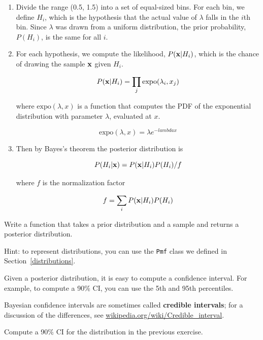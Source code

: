 \documentclass[12pt]{book}
\begin{document}
\begin{enumerate}

\item Divide the range (0.5, 1.5) into a set of equal-sized bins.
For each bin, we define $H_i$, which is the hypothesis that the
actual value of $\lambda$ falls in the $i$th bin.
Since $\lambda$ was drawn from a uniform distribution, the prior
probability, $P(H_i)$, is the same for all $i$.

\item For each hypothesis, we compute the likelihood, $P(\mathbf{x}|H_i)$,
which is the chance of drawing the sample $\mathbf{x}$ given $H_i$.

\[ P(\mathbf{x}|H_i) = \prod_j \mathrm{expo}(\lambda_i, x_j)  \]

where $\mathrm{expo}(\lambda, x)$ is a function that
computes the PDF of the exponential distribution with parameter $\lambda$,
evaluated at $x$.

\[ \mathrm{expo}(\lambda, x) = \lambda e^{-lambda x}\]

\item Then by Bayes's theorem the posterior distribution is

\[ P(H_i|\mathbf{x}) =  P(\mathbf{x}|H_i) P(H_i) / f \]

where $f$ is the normalization factor

\[ f = \sum_i P(\mathbf{x}|H_i) P(H_i) \]

\end{enumerate}


\begin{ex}

Write a function that takes a prior distribution and a sample and
returns a posterior distribution.

Hint: to represent distributions, you can use
the {\tt Pmf} class we defined in Section~\ref{distributions}.

\end{ex}

\begin{ex}

Given a posterior distribution, it is easy to compute a confidence
interval.  For example, to compute a 90\% CI, you can
use the 5th and 95th percentiles.

Bayesian confidence intervals are sometimes called {\bf credible
intervals}; for a discussion of the differences, see
\url{wikipedia.org/wiki/Credible_interval}.

Compute a 90\% CI for the distribution in the previous exercise.

\end{ex}
\end{document}
